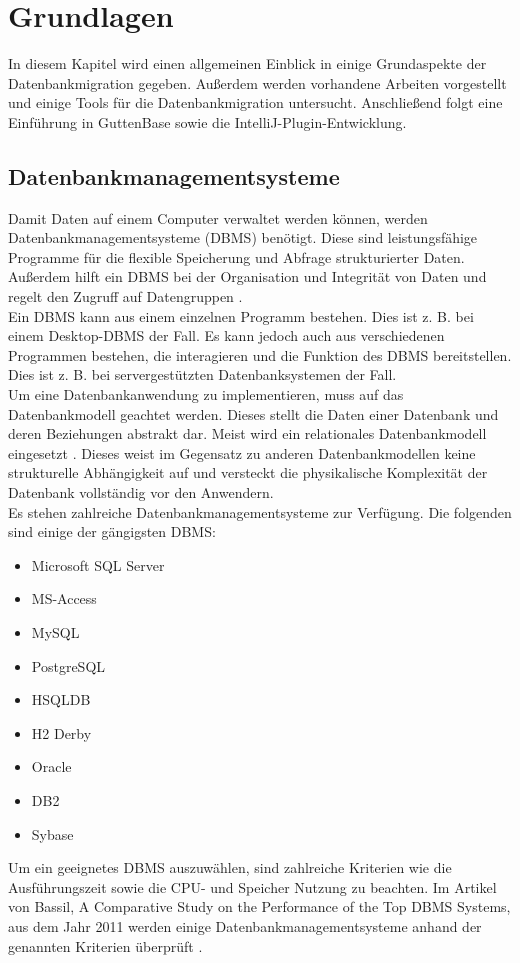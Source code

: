 \chapter{Grundlagen}
\label{sect:grundlagen}
In diesem Kapitel wird einen allgemeinen Einblick in einige Grundaspekte der Datenbankmigration gegeben. 
Außerdem werden vorhandene Arbeiten vorgestellt und einige Tools für die Datenbankmigration untersucht. Anschließend folgt eine Einführung in GuttenBase sowie die IntelliJ-Plugin-Entwicklung.

\section{Datenbankmanagementsysteme}
Damit Daten auf einem Computer verwaltet werden können, werden Datenbankmanagementsysteme (DBMS) benötigt. Diese sind leistungsfähige Programme für die flexible Speicherung und Abfrage strukturierter Daten. \\
Außerdem hilft ein DBMS bei der Organisation und Integrität von Daten und regelt den Zugruff auf Datengruppen \cite{geisler2014datenbanken}. \\
Ein DBMS kann aus einem einzelnen Programm bestehen. Dies ist z. B. bei einem Desktop-DBMS der Fall. Es kann jedoch auch aus verschiedenen Programmen bestehen, die interagieren und die Funktion des DBMS bereitstellen. Dies ist z. B. bei servergestützten Datenbanksystemen der Fall.\\
Um eine Datenbankanwendung zu implementieren, muss auf das Datenbankmodell geachtet werden. Dieses stellt die Daten einer Datenbank und deren Beziehungen abstrakt dar. Meist wird ein relationales Datenbankmodell eingesetzt \cite{niedereichholz1992relationales}. Dieses weist im Gegensatz zu anderen Datenbankmodellen keine strukturelle Abhängigkeit auf und versteckt die physikalische Komplexität der Datenbank vollständig vor den Anwendern.\\
Es stehen zahlreiche Datenbankmanagementsysteme zur Verfügung. Die folgenden sind einige der gängigsten DBMS:
\begin{itemize}
	\item Microsoft SQL Server
	\item MS-Access
	\item MySQL
	\item PostgreSQL
	\item HSQLDB
	\item H2 Derby
	\item Oracle
	\item DB2
	\item Sybase
\end{itemize}
Um ein geeignetes DBMS auszuwählen, sind zahlreiche Kriterien wie die Ausführungszeit sowie die CPU- und Speicher Nutzung zu beachten. Im Artikel von Bassil, A Comparative Study on the Performance of the Top DBMS Systems, aus dem Jahr 2011 werden einige Datenbankmanagementsysteme anhand der genannten Kriterien überprüft \cite{bassil2012comparative}.

